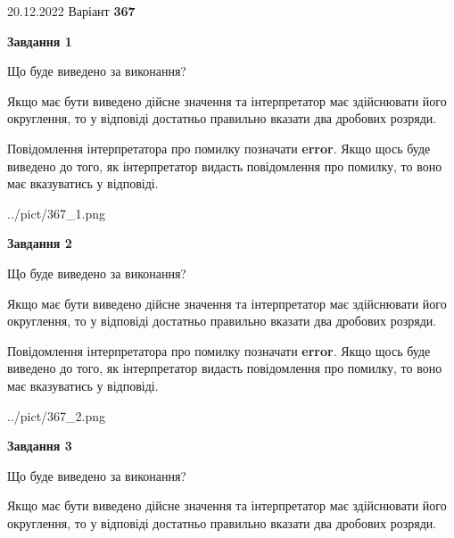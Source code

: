 \documentclass[12pt, ukrainian]{article}
\begin{document}
{20.12.2022 Варіант \No \textbf { 367 }\par}
{
\begin {Large}

{\begin {center}\textbf{Завдання 1}\end {center}}\par
Що буде виведено за виконання? \par

Якщо має бути виведено дійсне значення та інтерпретатор має здійснювати його округлення, 
то у відповіді достатньо правильно вказати два дробових розряди.

Повідомлення інтерпретатора про помилку позначати \textbf{error}.
Якщо щось буде виведено до того, як інтерпретатор видасть повідомлення про помилку, 
то воно має вказуватись у відповіді. \par

\begin{center}
	{../pict/367_1.png}
\end{center}
\newpage

{\begin {center}\textbf{Завдання 2}\end {center}}\par
Що буде виведено за виконання? \par

Якщо має бути виведено дійсне значення та інтерпретатор має здійснювати його округлення, 
то у відповіді достатньо правильно вказати два дробових розряди.

Повідомлення інтерпретатора про помилку позначати \textbf{error}.
Якщо щось буде виведено до того, як інтерпретатор видасть повідомлення про помилку, 
то воно має вказуватись у відповіді. \par

\begin{center}
	{../pict/367_2.png}
\end{center}
\newpage

{\begin {center}\textbf{Завдання 3}\end {center}}\par
Що буде виведено за виконання? \par

Якщо має бути виведено дійсне значення та інтерпретатор має здійснювати його округлення, 
то у відповіді достатньо правильно вказати два дробових розряди.


\end{Large}}
\end{document}
